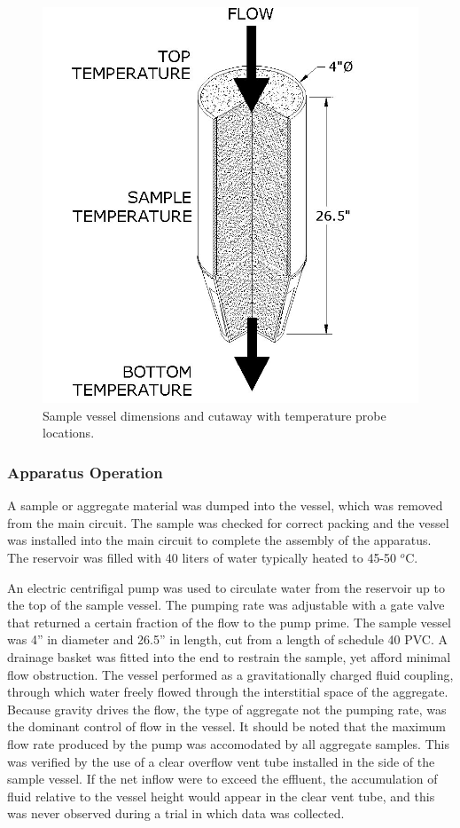 \begin{figure}[h]
 \label{isovessel}
\centering\includegraphics[scale=.35]{isoVessel.jpg}
 \caption{Sample vessel dimensions and cutaway with temperature probe locations.}
\end{figure}

\subsubsection{Apparatus Operation}
A sample or aggregate material was dumped into the vessel, which was removed from the main circuit. The sample was checked for correct packing and the vessel was installed into the main circuit to complete the assembly of the apparatus. The reservoir was filled with 40 liters of water typically heated to 45-50 $^{o}$C. 

An electric centrifigal pump was used to circulate water from the reservoir up to the top of the sample vessel. The pumping rate was adjustable with a gate valve that returned a certain fraction of the flow to the pump prime. The sample vessel was 4'' in diameter and 26.5'' in length, cut from a length of schedule 40 PVC. A drainage basket was fitted into the end to restrain the sample, yet afford minimal flow obstruction. The vessel performed as a gravitationally charged fluid coupling, through which water freely flowed through the interstitial space of the aggregate. Because gravity drives the flow, the type of aggregate not the pumping rate, was the dominant control of flow in the vessel. It should be noted that the maximum flow rate produced by the pump was accomodated by all aggregate samples. This was verified by the use of a clear overflow vent tube installed in the side of the sample vessel. If the net inflow were to exceed the effluent, the accumulation of fluid relative to the vessel height would appear in the clear vent tube, and this was never observed during a trial in which data was collected.

